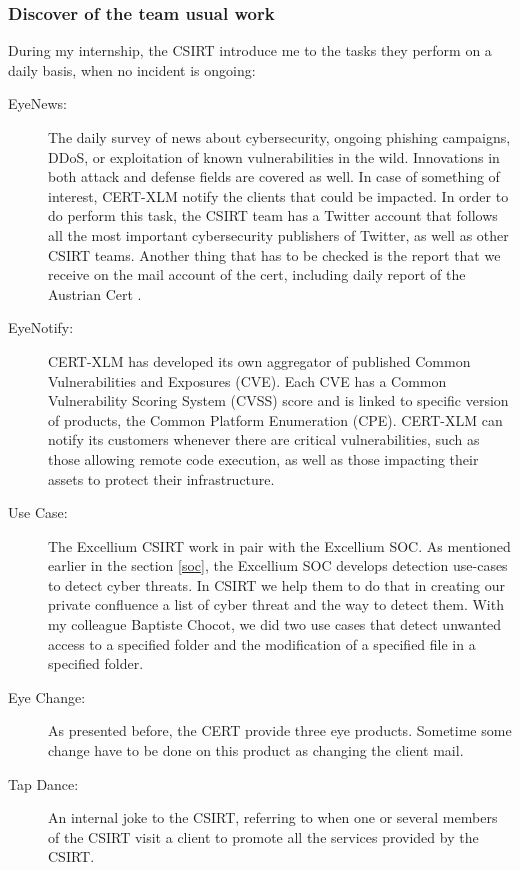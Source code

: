 \documentclass{tnreport}
\begin{document}
\subsubsection{Discover of the team usual work}
During my internship, the \gls{CSIRT} introduce me to the tasks they perform on a daily basis, when no incident is ongoing:  
\begin{description}
    \item[EyeNews:] The daily survey of news about cybersecurity, ongoing phishing campaigns, DDoS, or exploitation of known vulnerabilities in the wild. Innovations in both attack and defense fields are covered as well. In case of something of interest, \gls{CERT}-XLM notify the clients that could be impacted.
In order to do perform this task, the \gls{CSIRT} team has a Twitter account that follows all the most important cybersecurity publishers of Twitter, as well as other \gls{CSIRT} teams.
Another thing that has to be checked is the report that we receive on the mail account of the cert, including daily report of the Austrian Cert \cite{lib7}.
    \item[EyeNotify:] \gls{CERT}-XLM has developed its own aggregator of published Common Vulnerabilities and Exposures (\gls{CVE}). Each CVE has a Common Vulnerability Scoring System (\gls{CVSS}) score and is linked to specific version of products, the Common Platform Enumeration (\gls{CPE}). \gls{CERT}-XLM can notify its customers whenever there are critical vulnerabilities, such as those allowing remote code execution, as well as those impacting their assets to protect their infrastructure.
    \item[Use Case:] The \gls{Excellium} \gls{CSIRT} work in pair with the \gls{Excellium} \gls{SOC}. As mentioned earlier in the section \ref{soc}, the \gls{Excellium} \gls{SOC} develops detection use-cases to detect cyber threats. In \gls{CSIRT} we help them to do that in creating our private confluence a list of cyber threat and the way to detect them. With my colleague Baptiste Chocot, we did two use cases that detect unwanted access to a specified folder and the modification of a specified file in a specified folder.
    \item[Eye Change:] As presented before, the CERT provide three eye products. Sometime some change have to be done on this product as changing the client mail. 
    \item[Tap Dance:] An internal joke to the \gls{CSIRT}, referring to when one or several members of the \gls{CSIRT} visit a client to promote all the services provided by the \gls{CSIRT}. 

\end{description}
\end{document}

